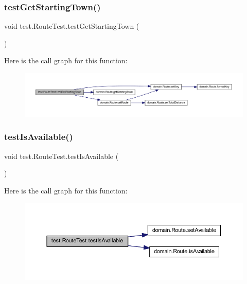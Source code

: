 \subsubsection{\texorpdfstring{test\+Get\+Starting\+Town()}{testGetStartingTown()}}
{\footnotesize\ttfamily void test.\+Route\+Test.\+test\+Get\+Starting\+Town (\begin{DoxyParamCaption}{ }\end{DoxyParamCaption})}

Here is the call graph for this function\+:\nopagebreak
\begin{figure}[H]
\begin{center}
\leavevmode
\includegraphics[width=350pt]{classtest_1_1_route_test_a7dacc77eab109864a56245621d7ec28e_cgraph}
\end{center}
\end{figure}
\mbox{\label{classtest_1_1_route_test_a524fd5dc10dd4319d44b20607e99c0a2}} 
\subsubsection{\texorpdfstring{test\+Is\+Available()}{testIsAvailable()}}
{\footnotesize\ttfamily void test.\+Route\+Test.\+test\+Is\+Available (\begin{DoxyParamCaption}{ }\end{DoxyParamCaption})}

Here is the call graph for this function\+:\nopagebreak
\begin{figure}[H]
\begin{center}
\leavevmode
\includegraphics[width=350pt]{classtest_1_1_route_test_a524fd5dc10dd4319d44b20607e99c0a2_cgraph}
\end{center}
\end{figure}
\mbox{\label{classtest_1_1_route_test_a7f25c69e5d23bf66b691c488755dbfc9}} 
